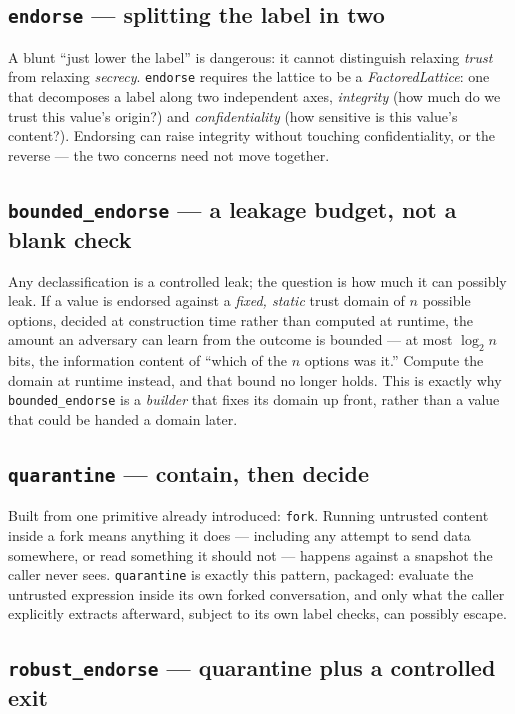 \documentclass[11pt, a4paper]{article}
\begin{document}
\begin{descirption}
{\subsection{\texttt{endorse} --- splitting the label in two}

A blunt ``just lower the label'' is dangerous: it cannot distinguish
relaxing \emph{trust} from relaxing \emph{secrecy}. \lstinline{endorse}
requires the lattice to be a \emph{FactoredLattice}: one that decomposes a
label along two independent axes, \emph{integrity} (how much do we trust
this value's origin?) and \emph{confidentiality} (how sensitive is this
value's content?). Endorsing can raise integrity without touching
confidentiality, or the reverse --- the two concerns need not move
together.

\subsection{\texttt{bounded\_endorse} --- a leakage budget, not a blank check}

Any declassification is a controlled leak; the question is how much it
can possibly leak. If a value is endorsed against a \emph{fixed, static}
trust domain of $n$ possible options, decided at construction time rather
than computed at runtime, the amount an adversary can learn from the
outcome is bounded --- at most $\log_2 n$ bits, the information content of
``which of the $n$ options was it.'' Compute the domain at runtime
instead, and that bound no longer holds. This is exactly why
\lstinline{bounded_endorse} is a \emph{builder} that fixes its domain up
front, rather than a value that could be handed a domain later.

\subsection{\texttt{quarantine} --- contain, then decide}

Built from one primitive already introduced: \lstinline{fork}. Running
untrusted content inside a fork means anything it does --- including any
attempt to send data somewhere, or read something it should not ---
happens against a snapshot the caller never sees. \lstinline{quarantine}
is exactly this pattern, packaged: evaluate the untrusted expression
inside its own forked conversation, and only what the caller explicitly
extracts afterward, subject to its own label checks, can possibly escape.

\subsection{\texttt{robust\_endorse} --- quarantine plus a controlled exit}

}
\end{descirption}
\end{document}
